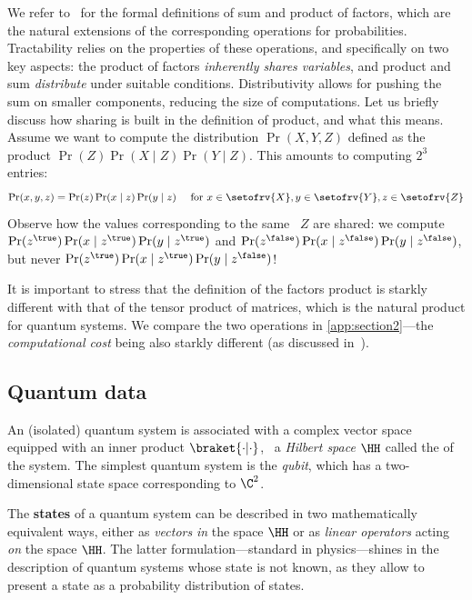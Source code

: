 We refer to~\cite{DarwicheHandbook} for the formal definitions of sum and product of factors, which are the natural extensions of the corresponding operations for probabilities.
Tractability relies on the properties of these operations, and specifically on two key aspects: the product of factors \emph{inherently shares variables}, and product and sum \emph{distribute} under suitable conditions. Distributivity allows for pushing the sum on smaller components, reducing the size of computations.
Let us briefly discuss how sharing is built in the definition of product, and what this means. 
Assume we want to compute the distribution $\Pr(X,Y,Z)$ defined as the product $ \Pr(Z) \Pr(X \mid Z) \Pr(Y \mid Z)$.
This amounts to computing $2^3$ entries:
\begin{equation*}
\Pr(x,y,z) = \Pr(z) \Pr(x \mid z) \Pr(y \mid z) \quad \text{ for } x\in \setofrv{X}, y\in \setofrv{Y}, z\in \setofrv{Z}
\end{equation*}
Observe how the values corresponding to the same \rv\ $Z$ are shared: we compute $\Pr(z^\true) \Pr(x \mid z^\true) \Pr(y \mid z^\true)$ and $\Pr(z^\false) \Pr(x \mid z^\false) \Pr(y \mid z^\false)$, but never $\Pr(z^\true) \Pr(x \mid z^\true) \Pr(y \mid z^\false)$!

It is important to stress that the definition of the factors product is starkly different with that of the tensor product of matrices, which is the natural product for quantum systems.
We compare the two operations in \cref{app:section2}---the \emph{computational cost} being also starkly different (as discussed in~\cite[Example~9.7]{popl24}).

\subsection{Quantum data}

An (isolated) quantum system is associated with a complex vector space equipped with an inner product $\braket{\cdot | \cdot}$, \ie\ a \emph{Hilbert space} $\HH$ called the  of the system.
The simplest quantum system is the \emph{qubit}, which has a two-dimensional state space corresponding to $\C^2$.

The \textbf{states} of a quantum system can be described in two mathematically equivalent ways, either as \emph{vectors} \emph{in} the space $\HH$ or as \emph{linear operators} acting \emph{on} the space $\HH$.
The latter formulation---standard in physics---shines in the description of quantum systems whose state is not known, as they allow to present a state as a probability distribution of states.

